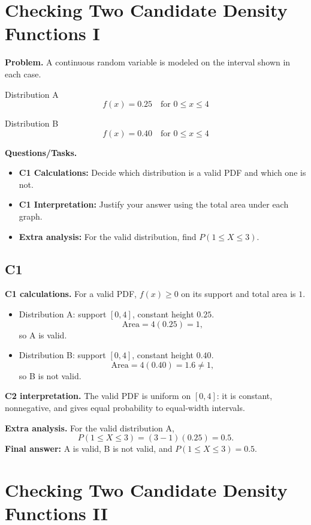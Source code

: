 	\section{Checking Two Candidate Density Functions I}
	
	\textbf{Problem.}
	A continuous random variable is modeled on the interval shown in each case.
	
	Distribution A
	\[
	f(x)=0.25\quad\text{for }0\le x\le 4
	\]
	
	Distribution B
	\[
	f(x)=0.40\quad\text{for }0\le x\le 4
	\]
	
	\textbf{Questions/Tasks.}
	\begin{itemize}
		\item \textbf{C1 Calculations:} Decide which distribution is a valid PDF and which one is not.
		\item \textbf{C1 Interpretation:} Justify your answer using the total area under each graph.
		\item \textbf{Extra analysis:} For the valid distribution, find $P(1\le X\le 3)$.
	\end{itemize}

	\subsection*{C1}

\textbf{C1 calculations.}
For a valid PDF, $f(x)\ge 0$ on its support and total area is $1$.
\begin{itemize}
	\item Distribution A: support $[0,4]$, constant height $0.25$.
	\[
	\text{Area}=4(0.25)=1,
	\]
	so A is valid.
	\item Distribution B: support $[0,4]$, constant height $0.40$.
	\[
	\text{Area}=4(0.40)=1.6\ne1,
	\]
	so B is not valid.
\end{itemize}

\textbf{C2 interpretation.}
The valid PDF is uniform on $[0,4]$: it is constant, nonnegative, and gives equal probability to equal-width intervals.

\textbf{Extra analysis.}
For the valid distribution A,
\[
P(1\le X\le 3)=(3-1)(0.25)=0.5.
\]
\textbf{Final answer:} A is valid, B is not valid, and $P(1\le X\le 3)=0.5$.

	\section{Checking Two Candidate Density Functions II}
	
